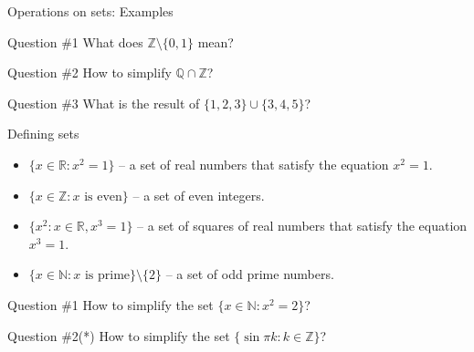 \documentclass{beamer}
\begin{document}
    \begin{frame}{Operations on sets: Examples}
      \begin{alertblock}{Question \#1}
        What does $\mathbb{Z} \setminus \{0,1\}$ mean?\pause
      \end{alertblock} 

      \begin{alertblock}{Question \#2}
        How to simplify $\mathbb{Q} \cap \mathbb{Z}$?\pause
      \end{alertblock}

      \begin{alertblock}{Question \#3}
        What is the result of $\{1,2,3\} \cup \{3,4,5\}$?
      \end{alertblock}
    \end{frame}

    \begin{frame}{Defining sets}
      \begin{example}
        \begin{itemize}
          \item $\{x \in \mathbb{R}: x^2 = 1\}$ -- a set of real numbers that satisfy the equation $x^2 = 1$.\pause
          \item $\{x \in \mathbb{Z}: x \text{ is even}\}$ -- a set of even integers.\pause
          \item $\{x^2: x \in \mathbb{R}, x^3 = 1\}$ -- a set of squares of real numbers that satisfy the equation $x^3 = 1$.\pause
          \item $\{x \in \mathbb{N}: x \text{ is prime}\} \setminus \{2\}$ -- a set of odd prime numbers.\pause
        \end{itemize}
      \end{example}

      \begin{alertblock}{Question \#1}
        How to simplify the set $\{x \in \mathbb{N}: x^2 = 2\}$?\pause
      \end{alertblock}
  
      \begin{alertblock}{Question \#2(*)}
        How to simplify the set $\{\sin \pi k: k \in \mathbb{Z}\}$?
      \end{alertblock}
    \end{frame}
\end{document}
